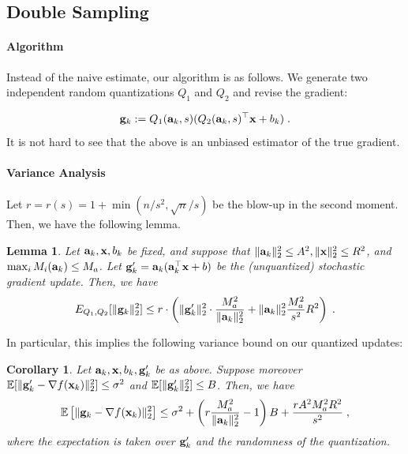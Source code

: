 \documentclass{article}
\def\a{{\bf a}}
\def\g{{\bf g}}
\def\x{{\bf x}}
\def\E{\mathbb{E}}
\newtheorem{lemma}{Lemma}
\newtheorem{corollary}{Corollary}
\begin{document}
\subsection{Double Sampling}

\paragraph{Algorithm}
Instead of the naive estimate, our algorithm is as follows.
We generate two independent
random quantizations $Q_1$
and $Q_2$ and revise the gradient:


\[
\g_k := Q_1 (\a_k, s) (Q_2 (\a_k, s)^\top \x + b_k) \; .
\]
It is not hard to see that the above is an unbiased estimator of the true gradient.

\paragraph{Variance Analysis}

Let $r = r(s) = 1 + \min (n / s^2, \sqrt{n}/ s)$ be the blow-up in the second moment.
Then, we have the following lemma.
\begin{lemma}
    Let $\a_k, \x, b_k$ be fixed, and suppose that $\| \a_k \|_2^2 \leq A^2, \| \x \|_2^2 \leq R^2$, and $\max_i M_i (\a_k) \leq M_a$.
    Let $\g'_k = \a_k (\a_k^\top \x + b)$ be the (unquantized) stochastic gradient update.
    Then, we have 
    \[
    E_{Q_1, Q_2} [\| \g_k \|_2^2] \leq r \cdot \left( \| \g'_k \|_2^2 \cdot \frac{M_a^2}{\| \a_k \|_2^2} + \| \a_k \|_2^2 \frac{M_a^2}{s^2} R^2 \right)\; .
    \]
\end{lemma}

In particular, this implies the following variance bound on our quantized updates:
\begin{corollary}
    Let $\a_k, \x, b_k, \g'_k$ be as above.
    Suppose moreover $\E [\| \g'_k - \nabla f(\x_k) \|_2^2 ] \leq \sigma^2$ and $\E [\| \g'_k \|_2^2] \leq B$.
    Then, we have
    \[
    \E \left[ \| \g_k - \nabla f(\x_k) \|_2^2 \right] \leq  \sigma^2 + \left(r \frac{M_a^2}{\| \a_k \|_2^2} - 1\right) B + \frac{r A^2 M_a^2 R^2}{s^2} \; ,
    \]
    where the expectation is taken over $\g'_k$ and the randomness of the quantization.
\end{corollary}
\end{document}
